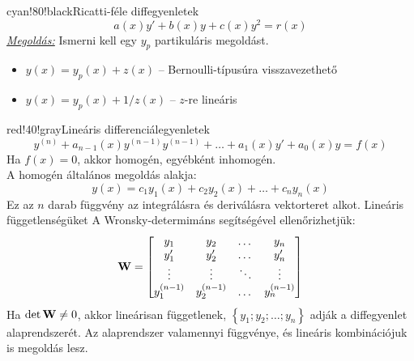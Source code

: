 \documentclass[main.tex]{subfiles}
\begin{document}
\begin{cbox}{cyan!80!black}{Ricatti-féle diffegyenletek}
  \[
    a(x) y' + b(x) y + c(x) y^2 = r(x)
  \]
  \emph{\underline{Megoldás:}}
  \quad Ismerni kell egy $y_p$ partikuláris megoldást.
  \begin{itemize}
    \item $y(x) = y_p(x) + z(x)$
          \tabto{4.4cm} – \tabto{5cm}
          Bernoulli-típusúra visszavezethető

    \item $y(x) = y_p(x) + 1/z(x)$
          \tabto{4.4cm} – \tabto{5cm}
          $z$-re lineáris
  \end{itemize}
\end{cbox}

\begin{cbox}{red!40!gray}{Lineáris differenciálegyenletek}
  \[
    y^{(n)}
    + a_{n-1}(x) y^{(n-1)} y^{(n-1)}
    + \dots
    + a_1(x) y'
    + a_0(x) y
    = f(x)
  \]
  Ha $f(x) = 0$, akkor homogén, egyébként inhomogén.
  \\[2mm]
  A homogén általános megoldás alakja:
  \[
    y(x)
    = c_1 y_1(x)
    + c_2 y_2(x)
    + \dots
    + c_n y_n(x)
  \]
  Ez az $n$ darab függvény az integrálásra és
  deriválásra vektorteret alkot. Lineáris függetlenségüket
  A Wronsky-determimáns segítségével ellenőrizhetjük:
  \[
    \mathbf{W} = \begin{bmatrix}
      y_1         & y_2         & \dots  & y_n         \\
      y_1'        & y_2'        & \dots  & y_n'        \\
      \vdots      & \vdots      & \ddots & \vdots      \\
      y_1^{(n-1)} & y_2^{(n-1)} & \dots  & y_n^{(n-1)} \\
    \end{bmatrix}
  \]
  Ha $\det \mathbf{W} \neq 0$, akkor lineárisan függetlenek,
  $\left\{ y_1; y_2; \dots; y_n \right\}$ adják a diffegyenlet
  alaprendszerét. Az alaprendszer valamennyi függvénye, és
  lineáris kombinációjuk is megoldás lesz.
\end{cbox}
\end{document}
